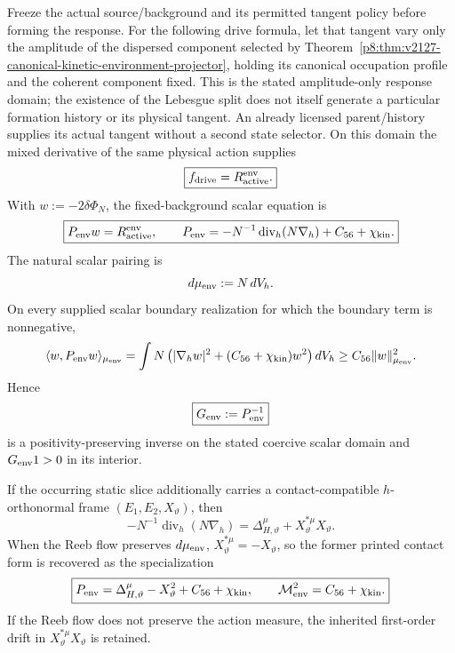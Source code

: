 \documentclass[12pt,a4paper]{article}
\begin{document}
\begin{theorem}
Freeze the actual source/background and its permitted tangent policy before
forming the response.  For the following drive formula, let that tangent
vary only the amplitude of the dispersed component selected by
Theorem~\ref{p8:thm:v2127-canonical-kinetic-environment-projector}, holding
its canonical occupation profile and the coherent component fixed.  This is
the stated amplitude-only response domain; the existence of the Lebesgue
split does not itself generate a particular formation history or its physical
tangent.  An already licensed parent/history supplies its actual tangent
without a second state selector.  On this domain the mixed derivative of the
same physical action supplies
\begin{equation}
\boxed{f_{\rm drive}=R_{\rm active}^{\rm env}.}
\label{p8:eq:v2129-environmental-source-drive}
\end{equation}
With $w:=-2\delta\Phi_N$, the fixed-background scalar equation is
\begin{equation}
\boxed{
 P_{\rm env}w=R_{\rm active}^{\rm env},
 \qquad
 P_{\rm env}
 =-N^{-1}\operatorname{div}_h(N\nabla_h)
  +C_{56}+\chi_{\rm kin}.}
\label{p8:eq:static-contact-green-hessian}
\end{equation}
The natural scalar pairing is
\begin{equation}
 d\mu_{\rm env}:=N\,dV_h.
\label{p8:eq:v2129-environment-action-measure}
\end{equation}
On every supplied scalar boundary realization for which the boundary term is
nonnegative,
\begin{equation}
 \langle w,P_{\rm env}w\rangle_{\mu_{\rm env}}
 =\int N\left(|\nabla_hw|^2+(C_{56}+\chi_{\rm kin})w^2\right)dV_h
 \ge C_{56}\|w\|_{\mu_{\rm env}}^2 .
\label{p8:eq:v2129-environment-coercivity}
\end{equation}
Hence
\begin{equation}
\boxed{G_{\rm env}:=P_{\rm env}^{-1}}
\label{p8:eq:v2129-environment-green}
\end{equation}
is a positivity-preserving inverse on the stated coercive scalar domain and
$G_{\rm env}1>0$ in its interior.

If the occurring static slice additionally carries a contact-compatible
$h$-orthonormal frame $(E_1,E_2,X_\vartheta)$, then
\begin{equation}
 -N^{-1}\operatorname{div}_h(N\nabla_h)
 =\Delta_{H,\vartheta}^{\mu}+X_\vartheta^{*\mu}X_\vartheta.
\label{p8:eq:v2129-weighted-contact-split}
\end{equation}
When the Reeb flow preserves $d\mu_{\rm env}$,
$X_\vartheta^{*\mu}=-X_\vartheta$, so the former printed contact form is
recovered as the specialization
\begin{equation}
\boxed{
 P_{\rm env}
 =\Delta_{H,\vartheta}^{\mu}-X_\vartheta^2
  +C_{56}+\chi_{\rm kin},
 \qquad
 \mathcal M_{\rm env}^2=C_{56}+\chi_{\rm kin}.}
\label{p8:eq:v2129-contact-environment-specialization}
\end{equation}
If the Reeb flow does not preserve the action measure, the inherited
first-order drift in $X_\vartheta^{*\mu}X_\vartheta$ is retained.
\end{theorem}
\end{document}
